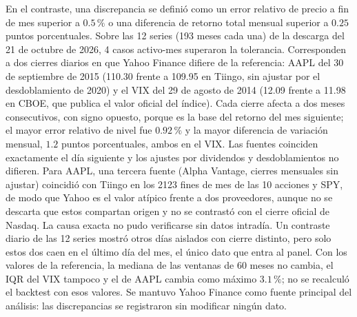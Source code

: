 En el contraste, una discrepancia se definió como un error relativo de precio a fin de mes superior a $0.5\,\%$ o una diferencia de retorno total mensual superior a $0.25$ puntos porcentuales. Sobre las 12 series (193 meses cada una) de la descarga del 21 de octubre de 2026, 4 casos activo-mes superaron la tolerancia. Corresponden a dos cierres diarios en que Yahoo Finance difiere de la referencia: AAPL del 30 de septiembre de 2015 (110.30 frente a 109.95 en Tiingo, sin ajustar por el desdoblamiento de 2020) y el VIX del 29 de agosto de 2014 (12.09 frente a 11.98 en CBOE, que publica el valor oficial del índice). Cada cierre afecta a dos meses consecutivos, con signo opuesto, porque es la base del retorno del mes siguiente; el mayor error relativo de nivel fue $0.92\,\%$ y la mayor diferencia de variación mensual, $1.2$ puntos porcentuales, ambos en el VIX. Las fuentes coinciden exactamente el día siguiente y los ajustes por dividendos y desdoblamientos no difieren. Para AAPL, una tercera fuente (Alpha Vantage, cierres mensuales sin ajustar) coincidió con Tiingo en los 2123 fines de mes de las 10 acciones y SPY, de modo que Yahoo es el valor atípico frente a dos proveedores, aunque no se descarta que estos compartan origen y no se contrastó con el cierre oficial de Nasdaq. La causa exacta no pudo verificarse sin datos intradía. Un contraste diario de las 12 series mostró otros días aislados con cierre distinto, pero solo estos dos caen en el último día del mes, el único dato que entra al panel. Con los valores de la referencia, la mediana de las ventanas de 60 meses no cambia, el IQR del VIX tampoco y el de AAPL cambia como máximo $3.1\,\%$; no se recalculó el backtest con esos valores. Se mantuvo Yahoo Finance como fuente principal del análisis: las discrepancias se registraron sin modificar ningún dato.



